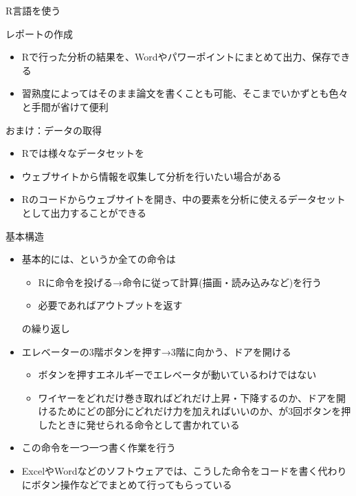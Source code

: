 \documentclass[
  ignorenonframetext,
]{beamer}
\providecommand{\tightlist}{%
  \setlength{\itemsep}{0pt}\setlength{\parskip}{0pt}}
\begin{document}
\begin{frame}[fragile]{R言語を使う}
\begin{block}{レポートの作成}
\protect\hypertarget{ux30ecux30ddux30fcux30c8ux306eux4f5cux6210}{}
\begin{itemize}
\tightlist
\item
  Rで行った分析の結果を、Wordやパワーポイントにまとめて出力、保存できる
\item
  習熟度によってはそのまま論文を書くことも可能、そこまでいかずとも色々と手間が省けて便利
\end{itemize}
\end{block}

\begin{block}{おまけ：データの取得}
\protect\hypertarget{ux304aux307eux3051ux30c7ux30fcux30bfux306eux53d6ux5f97}{}
\begin{itemize}
\tightlist
\item
  Rでは様々なデータセットを
\item
  ウェブサイトから情報を収集して分析を行いたい場合がある
\item
  Rのコードからウェブサイトを開き、中の要素を分析に使えるデータセットとして出力することができる
\end{itemize}
\end{block}

\begin{block}{基本構造}
\protect\hypertarget{ux57faux672cux69cbux9020}{}
\begin{itemize}
\item
  基本的には、というか全ての命令は

  \begin{itemize}
  \item
    Rに命令を投げる→命令に従って計算(描画・読み込みなど)を行う
  \item
    必要であればアウトプットを返す
  \end{itemize}

  の繰り返し
\item
  エレベーターの3階ボタンを押す→3階に向かう、ドアを開ける

  \begin{itemize}
  \tightlist
  \item
    ボタンを押すエネルギーでエレベータが動いているわけではない
  \item
    ワイヤーをどれだけ巻き取ればどれだけ上昇・下降するのか、ドアを開けるためにどの部分にどれだけ力を加えればいいのか、が3回ボタンを押したときに発せられる命令として書かれている
  \end{itemize}
\item
  この命令を一つ一つ書く作業を行う
\item
  ExcelやWordなどのソフトウェアでは、こうした命令をコードを書く代わりにボタン操作などでまとめて行ってもらっている
\end{itemize}
\end{block}


\end{frame}
\end{document}
